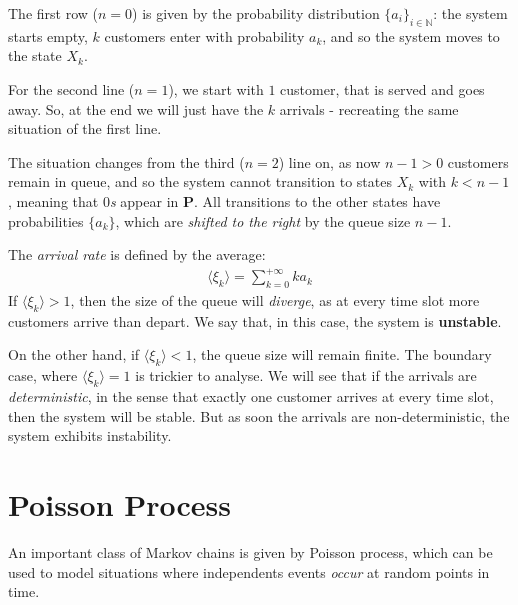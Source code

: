 \documentclass[../template.tex]{subfiles}
\begin{document}
The first row ($n=0$) is given by the probability distribution $\{a_i\}_{i\in \mathbb{N}}$: the system starts empty, $k$ customers enter with probability $a_k$, and so the system moves to the state $X_k$.

\medskip

For the second line ($n=1$), we start with $1$ customer, that is served and goes away. So, at the end we will just have the $k$ arrivals - recreating the same situation of the first line.

\medskip

The situation changes from the third ($n=2$) line on, as now $n-1 > 0$ customers remain in queue, and so the system cannot transition to states $X_k$ with $k<n-1$, meaning that $0$\textit{s} appear in \textbf{P}. All transitions to the other states have probabilities $\{a_k\}$, which are \textit{shifted to the right} by the queue size $n-1$. 

\medskip

The \textit{arrival rate} is defined by the average:
\begin{align*}
    \langle \xi_k \rangle = \sum_{k=0}^{+\infty} k a_k 
\end{align*} 
If $\langle \xi_k \rangle > 1$, then the size of the queue will \textit{diverge}, as at every time slot more customers arrive than depart. We say that, in this case, the system is \textbf{unstable}.

On the other hand, if $\langle \xi_k \rangle < 1$, the queue size will remain finite. The boundary case, where $\langle \xi_k \rangle = 1$ is trickier to analyse. We will see that if the arrivals are \textit{deterministic}, in the sense that exactly one customer arrives at every time slot, then the system will be stable. But as soon the arrivals are non-deterministic, the system exhibits instability. 


\section{Poisson Process}
An important class of Markov chains is given by Poisson process, which can be used to model situations where independents events \textit{occur} at random points in time. 

\medskip
\end{document}
